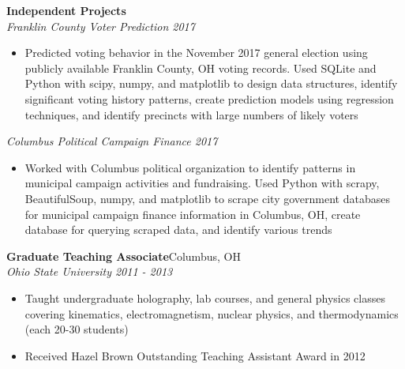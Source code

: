 \documentclass[line]{letter}
\begin{document}
\begin{addmargin}[1em]{1em}
{\large {\bf Independent Projects}\vspace{1mm}}\\
\vspace{-2mm}
{\large \it Franklin County Voter Prediction \hfill 2017} \\
\vspace{-5mm}
\begin{itemize}[leftmargin=5mm]
\item Predicted voting behavior in the November 2017 general election using publicly available Franklin County, OH voting records. Used SQLite and Python with scipy, numpy, and matplotlib to design data structures, identify significant voting history patterns, create prediction models using regression techniques, and identify precincts with large numbers of likely voters
\end{itemize}
\vspace{-1mm}
{\large \it Columbus Political Campaign Finance \hfill 2017} \\
\vspace{-7mm}
\begin{itemize}[leftmargin=5mm]
\item Worked with Columbus political organization to identify patterns in municipal campaign activities and fundraising. Used Python with scrapy, BeautifulSoup, numpy, and matplotlib to scrape city government databases for municipal campaign finance information in Columbus, OH, create database for querying scraped data, and identify various trends
\end{itemize}


{\large {\bf Graduate Teaching Associate}\hfill Columbus, OH\vspace{1mm}}\\
{\large \it Ohio State University \hfill 2011 - 2013} \\
\vspace{-7mm}
\begin{itemize}[leftmargin=5mm]
\item Taught undergraduate holography, lab courses, and general physics classes covering kinematics, electromagnetism, nuclear physics, and thermodynamics (each 20-30 students)
\item Received Hazel Brown Outstanding Teaching Assistant Award in 2012
\end{itemize}

\end{addmargin}

\end{document}
